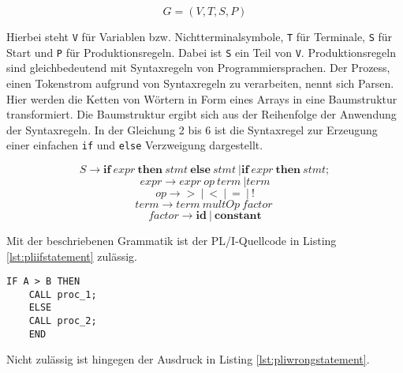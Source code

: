 \begin{center}
	\begin{equation}\label{eqn:grammar}
		G=(V,T,S,P)
	\end{equation}
\end{center}


Hierbei steht \verb+V+ für Variablen bzw. Nichtterminalsymbole, \verb+T+ für Terminale, \verb+S+ für Start und \verb+P+ für Produktionsregeln. Dabei ist \verb+S+ ein Teil von \verb+V+. Produktionsregeln sind gleichbedeutend mit Syntaxregeln von Programmiersprachen. 
Der Prozess, einen Tokenstrom aufgrund von Syntaxregeln zu verarbeiten, nennt sich Parsen.
Hier werden die Ketten von Wörtern in Form eines Arrays in eine Baumstruktur transformiert.
Die Baumstruktur ergibt sich aus der Reihenfolge der Anwendung der Syntaxregeln. In der Gleichung 2 bis 6 ist die Syntaxregel zur Erzeugung einer einfachen \verb+if+ und \verb+else+ Verzweigung dargestellt.

\begin{center}
	\begin{equation}\label{eqn:start}
		S \to \mathbf{if}\: expr\: \mathbf{then}\: stmt\: \mathbf{else}\: stmt\: | \mathbf{if}\: expr\: \mathbf{then}\: stmt;
	\end{equation}
	\begin{equation}
		expr \to expr\: op\: term\: | term
	\end{equation}
	\begin{equation}
		op \to \mathbf{>}\: |\: \mathbf{<}\: |\: \mathbf{=}\: |\: \mathbf{!}
	\end{equation}
	\begin{equation}
		term \to term\: multOp\: factor\:
	\end{equation}
	\begin{equation}
		factor \to \mathbf{id}\: |\: \mathbf{constant}
	\end{equation}
\end{center}

\pagebreak
Mit der beschriebenen Grammatik ist der PL/I-Quellcode in Listing \ref{lst:pliifstatement} zulässig.

\begin{lstlisting}[language=PL/I, caption=PL/I-Verzweigung, label={lst:pliifstatement}]
	IF A > B THEN
	CALL proc_1;
	ELSE
	CALL proc_2;
	END
\end{lstlisting}

Nicht zulässig ist hingegen der Ausdruck in Listing \ref{lst:pliwrongstatement}.

